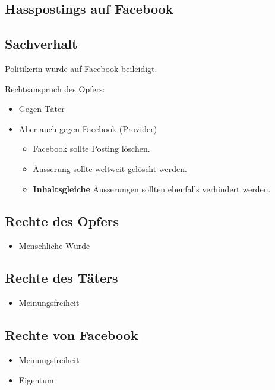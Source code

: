 \documentclass[12pt]{article}
\begin{document}
    \begin{center}
        \section*{Hasspostings auf Facebook}
    \end{center}
    \subsection{Sachverhalt}
    Politikerin wurde auf Facebook beileidigt.
    
    Rechtsanspruch des Opfers:
    \begin{itemize}
        \item Gegen Täter
        \item Aber auch gegen Facebook (Provider)
        \begin{itemize}
            \item Facebook sollte Posting löschen.
            \item Äusserung sollte weltweit gelöscht werden.
            \item \textbf{Inhaltsgleiche} Äusserungen sollten ebenfalls verhindert werden.
        \end{itemize}
    \end{itemize}

    \subsection{Rechte des Opfers}
    \begin{itemize}
        \item Menschliche Würde
    \end{itemize}

    \subsection{Rechte des Täters}
    \begin{itemize}
        \item Meinungsfreiheit
    \end{itemize}

    \subsection{Rechte von Facebook}
    \begin{itemize}
        \item Meinungsfreiheit
        \item Eigentum
    \end{itemize}
\end{document}
